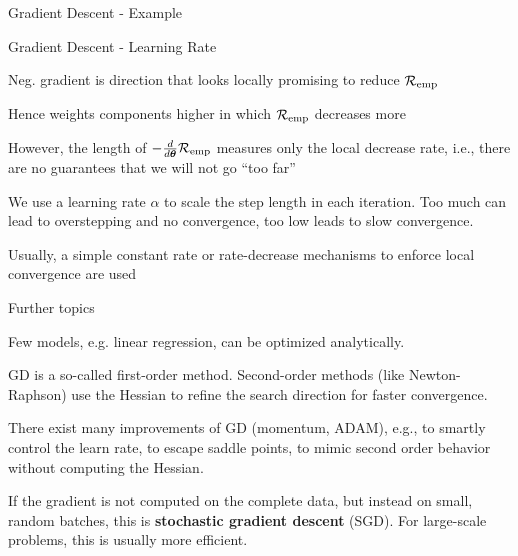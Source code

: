 \documentclass[11pt,compress,t,notes=noshow, xcolor=table]{beamer}
\begin{document}
\begin{frame2}{Gradient Descent - Example}
\vfill
{}
\end{frame2}


\begin{framei}[fs=footnotesize]{Gradient Descent - Learning Rate}
\item Neg. gradient is direction that looks locally promising to reduce $\mathcal{R}_{\text{emp}}$
\item Hence weights components higher in which $\mathcal{R}_{\text{emp}}$ decreases more
\item However, the length of $-\frac{d}{d\bm{\theta}}{\mathcal{R}_{\text{emp}}}$ measures only the local decrease rate, i.e., there are no guarantees that we will not go ``too far''
\item We use a learning rate $\alpha$ to scale the step length in each iteration. Too much can lead to overstepping and no convergence, too low leads to slow convergence.
\item Usually, a simple constant rate or rate-decrease mechanisms to enforce local convergence are used
\begin{figure}[!htb]
\end{figure}
\end{framei}

\begin{framei}{Further topics}
\item Few models, e.g. linear regression, can be optimized analytically. 
\item GD is a so-called first-order method. Second-order methods (like Newton-Raphson) use the Hessian to refine the search direction for faster convergence.
\item There exist many improvements of GD (momentum, ADAM), e.g., to smartly control the learn rate, to escape saddle points, to mimic second order behavior without computing the Hessian.
\item If the gradient is not computed on the complete data, but instead on small, random batches, this is \textbf{stochastic gradient descent} (SGD). For large-scale problems, this is usually more efficient.
\end{framei}

\endlecture
\end{document}
